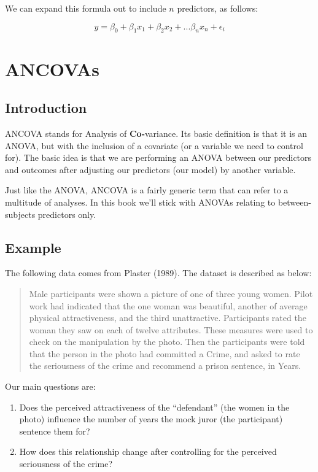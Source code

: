 \documentclass[
]{book}
\providecommand{\tightlist}{%
  \setlength{\itemsep}{0pt}\setlength{\parskip}{0pt}}
\begin{document}
We can expand this formula out to include \(n\) predictors, as follows:

\[
y = \beta_0 + \beta_1x_1 +\beta_2x_2 + ... \beta_nx_n + \epsilon_i
\]

\section{ANCOVAs}\label{ancovas}

\subsection{Introduction}\label{introduction-4}

ANCOVA stands for Analysis of \textbf{Co-}variance. Its basic definition is that it is an ANOVA, but with the inclusion of a covariate (or a variable we need to control for). The basic idea is that we are performing an ANOVA between our predictors and outcomes after adjusting our predictors (our model) by another variable.

Just like the ANOVA, ANCOVA is a fairly generic term that can refer to a multitude of analyses. In this book we'll stick with ANOVAs relating to between-subjects predictors only.

\subsection{Example}\label{example-6}

The following data comes from Plaster (1989). The dataset is described as below:

\begin{quote}
Male participants were shown a picture of one of three young women. Pilot work had indicated that the one woman was beautiful, another of average physical attractiveness, and the third unattractive. Participants rated the woman they saw on each of twelve attributes. These measures were used to check on the manipulation by the photo.
Then the participants were told that the person in the photo had committed a Crime, and asked to rate the seriousness of the crime and recommend a prison sentence, in Years.
\end{quote}

Our main questions are:

\begin{enumerate}
\def\labelenumi{\arabic{enumi}.}
\tightlist
\item
  Does the perceived attractiveness of the ``defendant'' (the women in the photo) influence the number of years the mock juror (the participant) sentence them for?
\item
  How does this relationship change after controlling for the perceived seriousness of the crime?
\end{enumerate}
\end{document}
